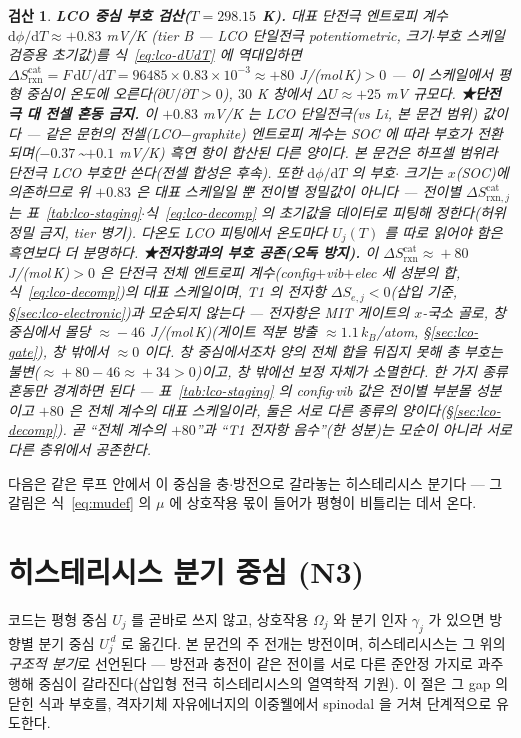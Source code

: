 \documentclass[11pt,a4paper]{article}
\newtheorem*{verifybox}{검산}
\newcommand{\dd}{\mathrm{d}}
\newcommand{\rxn}{\mathrm{rxn}}
\begin{document}
\begin{verifybox}
\textbf{LCO 중심 부호 검산($T=298.15$ K).} 대표 단전극 엔트로피 계수 $\dd\phi/\dd T\approx+0.83$ mV/K\cite{swiderska2019}
(tier B — LCO \emph{단일전극} potentiometric, 크기$\cdot$부호 스케일 검증용 초기값)를 식~\eqref{eq:lco-dUdT}
에 역대입하면 $\Delta S_{\rxn}^\mathrm{cat}=F\,\dd U/\dd T=96485\times0.83\times10^{-3}\approx+80$ J/(mol\,K)$>0$ —
이 스케일에서 평형 중심이 온도에 \emph{오른다}($\partial U/\partial T>0$), $30$ K 창에서 $\Delta U\approx+25$ mV 규모다.
\textbf{★단전극 대 전셀 혼동 금지.} 이 $+0.83$ mV/K 는 \emph{LCO 단일전극}(vs Li, 본 문건 범위) 값이다 — 같은 문헌의
\emph{전셀}(LCO$-$graphite) 엔트로피 계수는 SOC 에 따라 부호가 전환되며($-0.37$\,\textasciitilde$+0.1$ mV/K) 흑연 항이
합산된 다른 양이다. 본 문건은 하프셀 범위라 단전극 LCO 부호만 쓴다(전셀 합성은 후속). 또한 $\dd\phi/\dd T$ 의 부호$\cdot$
크기는 $x$(SOC)에 의존하므로 위 $+0.83$ 은 \emph{대표 스케일}일 뿐 전이별 정밀값이 아니다 — 전이별 $\Delta S_{\rxn,j}^\mathrm{cat}$
는 표~\ref{tab:lco-staging}$\cdot$식~\eqref{eq:lco-decomp} 의 초기값을 데이터로 피팅해 정한다(허위 정밀 금지, tier 병기).
다온도 LCO 피팅에서 온도마다 $U_j(T)$ 를 따로 읽어야 함은 흑연보다 더 분명하다.
\textbf{★전자항과의 부호 공존(오독 방지).} 이 $\Delta S_{\rxn}^\mathrm{cat}\!\approx\!+80$ J/(mol\,K)$>0$ 은
단전극 전체 엔트로피 계수(config$+$vib$+$elec 세 성분의 \emph{합}, 식~\eqref{eq:lco-decomp})의 \emph{대표 스케일}이며,
T1 의 전자항 $\Delta S_{e,j}<0$(삽입 기준, \S\ref{sec:lco-electronic})과 모순되지 않는다 — 전자항은 MIT 게이트의
$x$-\emph{국소 골}로, 창 중심에서 몰당 $\approx\!-46$ J/(mol\,K)(게이트 적분 방출 $\approx\!1.1\,k_B$/atom,
\S\ref{sec:lco-gate}), 창 밖에서 $\approx\!0$ 이다. 창 중심에서조차 양의 전체 합을 뒤집지 못해
\emph{총 부호는 불변}($\approx\!+80-46\approx\!+34>0$)이고, 창 밖에선 보정 자체가 소멸한다. 한 가지 종류 혼동만
경계하면 된다 — 표~\ref{tab:lco-staging} 의 config$\cdot$vib 값은 \emph{전이별 부분몰} 성분이고 $+80$ 은 \emph{전체 계수}의
대표 스케일이라, 둘은 \emph{서로 다른 종류의 양}이다(\S\ref{sec:lco-decomp}). 곧 ``전체 계수의 $+80$''과
``T1 전자항 음수''(한 성분)는 모순이 아니라 서로 다른 층위에서 공존한다.
\end{verifybox}

다음은 같은 루프 안에서 이 중심을 충$\cdot$방전으로 갈라놓는 히스테리시스 분기다 — 그 갈림은 식~\eqref{eq:mudef} 의
$\mu$ 에 상호작용 몫이 들어가 평형이 비틀리는 데서 온다.

\section{히스테리시스 분기 중심 (N3)}\label{sec:hys}
코드는 평형 중심 $U_j$ 를 곧바로 쓰지 않고, 상호작용 $\Omega_j$ 와 분기 인자 $\gamma_j$ 가 있으면 방향별 분기 중심
$U_j^{\,d}$ 로 옮긴다. 본 문건의 주 전개는 방전이며, 히스테리시스는 그 위의 \emph{구조적 분기}로 선언된다 — 방전과 충전이
같은 전이를 서로 다른 준안정 가지로 과주행해 중심이 갈라진다(삽입형 전극 히스테리시스의 열역학적 기원\cite{dreyer2010}).
이 절은 그 gap 의 닫힌 식과 부호를, 격자기체 자유에너지의
이중웰에서 spinodal 을 거쳐 단계적으로 유도한다.
\end{document}
